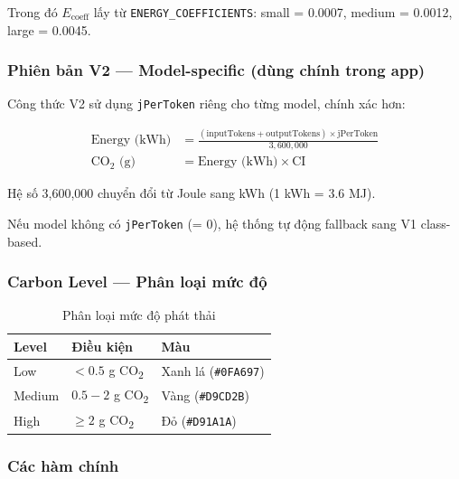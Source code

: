 \documentclass[12pt,a4paper]{article}
\begin{document}
Trong đó $E_{\text{coeff}}$ lấy từ \texttt{ENERGY\_COEFFICIENTS}: small = 0.0007, medium = 0.0012, large = 0.0045.

\subsubsection{Phiên bản V2 — Model-specific (dùng chính trong app)}

Công thức V2 sử dụng \texttt{jPerToken} riêng cho từng model, chính xác hơn:

\begin{align}
    \text{Energy (kWh)} &= \frac{(\text{inputTokens} + \text{outputTokens}) \times \text{jPerToken}}{3{,}600{,}000} \\
    \text{CO}_2 \text{ (g)} &= \text{Energy (kWh)} \times \text{CI}
\end{align}

Hệ số 3,600,000 chuyển đổi từ Joule sang kWh (1 kWh = 3.6 MJ).

Nếu model không có \texttt{jPerToken} (= 0), hệ thống tự động fallback sang V1 class-based.

\subsubsection{Carbon Level — Phân loại mức độ}

\begin{table}[h]
    \centering
    \begin{tabular}{lll}
        \toprule
        \textbf{Level} & \textbf{Điều kiện} & \textbf{Màu} \\
        \midrule
        Low    & $< 0.5$ g CO\textsubscript{2} & Xanh lá (\texttt{\#0FA697}) \\
        Medium & $0.5 - 2$ g CO\textsubscript{2} & Vàng (\texttt{\#D9CD2B}) \\
        High   & $\geq 2$ g CO\textsubscript{2}  & Đỏ (\texttt{\#D91A1A}) \\
        \bottomrule
    \end{tabular}
    \caption{Phân loại mức độ phát thải}
\end{table}

\subsubsection{Các hàm chính}
\end{document}
